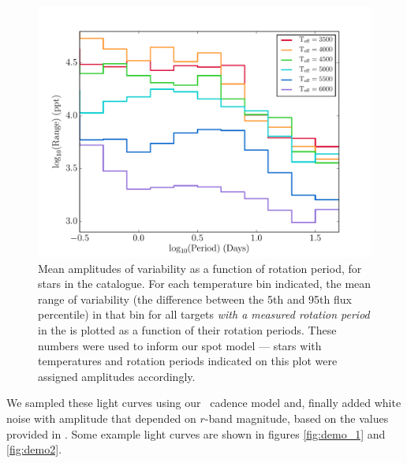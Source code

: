 \begin{figure}
\begin{center}
\includegraphics[width=6in, clip=true]{figures/amp_hist.pdf}
\caption[The mean amplitudes of variability for stars in the
\citet{Mcquillan2014} catalogue, according to their temperatures.]
{Mean amplitudes of variability as a function of rotation period, for stars
in the \citet{Mcquillan2014} catalogue.
For each temperature bin indicated, the mean range of variability (the
difference between the 5th and 95th flux percentile) in that bin for all
targets {\it with a measured rotation period} in the \citet{Mcquillan2014} is
plotted as a function of their rotation periods.
These numbers were used to inform our spot model --- stars with temperatures
and rotation periods indicated on this plot were assigned amplitudes
accordingly.
}
\label{fig:amp_hist}
\end{center}
\end{figure}

We sampled these light curves using our \LSST\ cadence model and, finally
added white noise with amplitude that depended on
$r$-band magnitude, based on the values provided in \citet{Jacklin2015}.
Some example light curves are shown in figures \ref{fig:demo_1} and
\ref{fig:demo2}.

